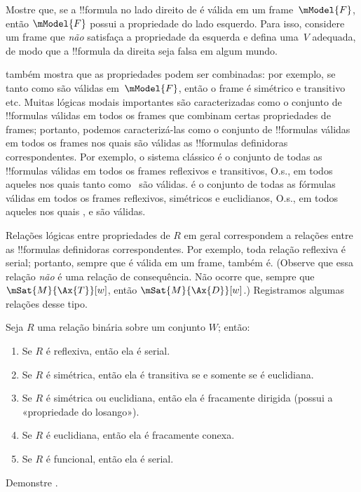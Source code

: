 \documentclass[../../../include/open-logic-section]{subfiles}
\begin{document}
\begin{prob}
Mostre que, se a !!{formula} no lado direito de
 é válida em um frame~$\mModel{F}$,
então $\mModel{F}$ possui a propriedade do lado esquerdo. Para isso, considere
um frame que \emph{não} satisfaça a propriedade da esquerda e defina uma~$V$
adequada, de modo que a !!{formula} da direita seja falsa em algum mundo.
\end{prob}

 também mostra que as propriedades podem ser
combinadas: por exemplo, se tanto  como  são válidas
em~$\mModel{F}$, então o frame é simétrico e transitivo etc. Muitas lógicas
modais importantes são caracterizadas como o conjunto de !!{formula}s válidas
em todos os frames que combinam certas propriedades de frames; portanto,
podemos caracterizá-las como o conjunto de !!{formula}s válidas em todos os
frames nos quais são válidas as !!{formula}s definidoras correspondentes. Por
exemplo, o sistema clássico  é o conjunto de todas as !!{formula}s
válidas em todos os frames reflexivos e transitivos, O.s.\@, em todos aqueles
nos quais tanto  como~ são válidas.  é o conjunto de todas
as fórmulas válidas em todos os frames reflexivos, simétricos e euclidianos,
O.s.\@, em todos aqueles nos quais ,  e  são válidas.

Relações lógicas entre propriedades de $R$ em geral correspondem a relações
entre as !!{formula}s definidoras correspondentes. Por exemplo, toda relação
reflexiva é serial; portanto, sempre que  é válida em um frame, 
também é. (Observe que essa relação \emph{não} é uma relação de consequência.
Não ocorre que, sempre que $\mSat{M}{\Ax{T}}[w]$, então
$\mSat{M}{\Ax{D}}[w]$.) Registramos algumas relações desse tipo.

\begin{prop}
  Seja $R$ uma relação binária sobre um conjunto $W$; então:
  \begin{enumerate}
  \item Se $R$ é reflexiva, então ela é serial.
  \item Se $R$ é simétrica, então ela é transitiva se e somente se é
    euclidiana.
  \item Se $R$ é simétrica ou euclidiana, então ela é fracamente dirigida
    (possui a «propriedade do losango»).
  \item Se $R$ é euclidiana, então ela é fracamente conexa.
  \item Se $R$ é funcional, então ela é serial.
  \end{enumerate}
\end{prop}

\begin{prob}
  Demonstre .
\end{prob}
\end{document}
